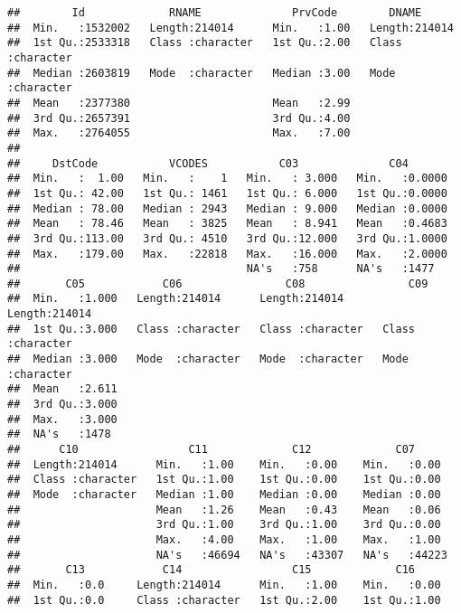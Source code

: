 \documentclass[
]{article}
\begin{document}
\begin{verbatim}
##        Id             RNAME              PrvCode        DNAME          
##  Min.   :1532002   Length:214014      Min.   :1.00   Length:214014     
##  1st Qu.:2533318   Class :character   1st Qu.:2.00   Class :character  
##  Median :2603819   Mode  :character   Median :3.00   Mode  :character  
##  Mean   :2377380                      Mean   :2.99                     
##  3rd Qu.:2657391                      3rd Qu.:4.00                     
##  Max.   :2764055                      Max.   :7.00                     
##                                                                        
##     DstCode           VCODES           C03              C04        
##  Min.   :  1.00   Min.   :    1   Min.   : 3.000   Min.   :0.0000  
##  1st Qu.: 42.00   1st Qu.: 1461   1st Qu.: 6.000   1st Qu.:0.0000  
##  Median : 78.00   Median : 2943   Median : 9.000   Median :0.0000  
##  Mean   : 78.46   Mean   : 3825   Mean   : 8.941   Mean   :0.4683  
##  3rd Qu.:113.00   3rd Qu.: 4510   3rd Qu.:12.000   3rd Qu.:1.0000  
##  Max.   :179.00   Max.   :22818   Max.   :16.000   Max.   :2.0000  
##                                   NA's   :758      NA's   :1477    
##       C05            C06                C08                C09           
##  Min.   :1.000   Length:214014      Length:214014      Length:214014     
##  1st Qu.:3.000   Class :character   Class :character   Class :character  
##  Median :3.000   Mode  :character   Mode  :character   Mode  :character  
##  Mean   :2.611                                                           
##  3rd Qu.:3.000                                                           
##  Max.   :3.000                                                           
##  NA's   :1478                                                            
##      C10                 C11             C12             C07       
##  Length:214014      Min.   :1.00    Min.   :0.00    Min.   :0.00   
##  Class :character   1st Qu.:1.00    1st Qu.:0.00    1st Qu.:0.00   
##  Mode  :character   Median :1.00    Median :0.00    Median :0.00   
##                     Mean   :1.26    Mean   :0.43    Mean   :0.06   
##                     3rd Qu.:1.00    3rd Qu.:1.00    3rd Qu.:0.00   
##                     Max.   :4.00    Max.   :1.00    Max.   :1.00   
##                     NA's   :46694   NA's   :43307   NA's   :44223  
##       C13            C14                 C15             C16        
##  Min.   :0.0     Length:214014      Min.   :1.00    Min.   :0.00    
##  1st Qu.:0.0     Class :character   1st Qu.:2.00    1st Qu.:1.00    

\end{verbatim}
\end{document}
